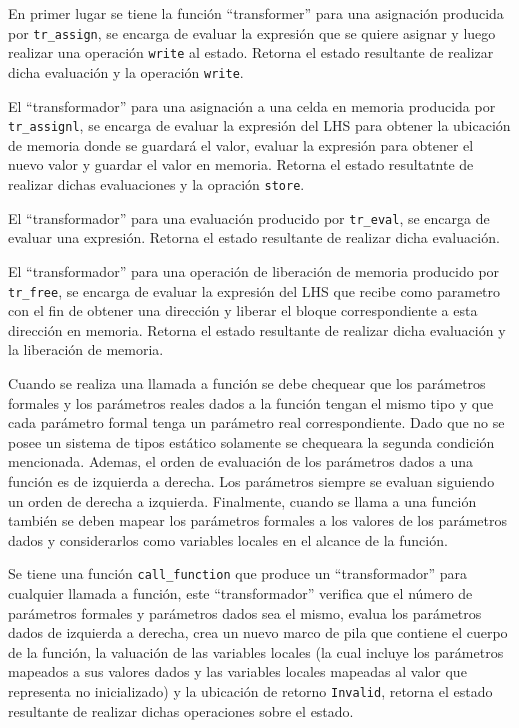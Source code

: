 En primer lugar se tiene la función ``transformer'' para una asignación producida por \verb|tr_assign|, se encarga de evaluar la expresión que se quiere asignar y luego realizar una operación \verb|write| al estado.
Retorna el estado resultante de realizar dicha evaluación y la operación \verb|write|.

El ``transformador'' para una asignación a una celda en memoria producida por \verb|tr_assignl|, se encarga de evaluar la expresión del LHS para obtener la ubicación de memoria donde se guardará el valor, evaluar la expresión para obtener el nuevo valor y guardar el valor en memoria.
Retorna el estado resultatnte de realizar dichas evaluaciones y la opración \verb|store|.

El ``transformador'' para una evaluación producido por \verb|tr_eval|, se encarga de evaluar una expresión.
Retorna el estado resultante de realizar dicha evaluación.

El ``transformador'' para una operación de liberación de memoria producido por \verb|tr_free|, se encarga de evaluar la expresión del LHS que recibe como parametro con el fin de obtener una dirección y liberar el bloque correspondiente a esta dirección en memoria.
Retorna el estado resultante de realizar dicha evaluación y la liberación de memoria.

Cuando se realiza una llamada a función se debe chequear que los parámetros formales y los parámetros reales dados a la función tengan el mismo tipo y que cada parámetro formal tenga un parámetro real correspondiente.
Dado que no se posee un sistema de tipos estático solamente se chequeara la segunda condición mencionada.
Ademas, el orden de evaluación de los parámetros dados a una función es de izquierda a derecha.
Los parámetros siempre se evaluan siguiendo un orden de derecha a izquierda.
Finalmente, cuando se llama a una función también se deben mapear los parámetros formales a los valores de los parámetros dados y considerarlos como variables locales en el alcance de la función.

Se tiene una función \verb|call_function| que produce un ``transformador'' para cualquier llamada a función, este ``transformador'' verifica que el número de parámetros formales y parámetros dados sea el mismo, evalua los parámetros dados de izquierda a derecha, crea un nuevo marco de pila que contiene el cuerpo de la función, la valuación de las variables locales (la cual incluye los parámetros mapeados a sus valores dados y las variables locales mapeadas al valor que representa no inicializado) y la ubicación de retorno \verb|Invalid|, retorna el estado resultante de realizar dichas operaciones sobre el estado.

